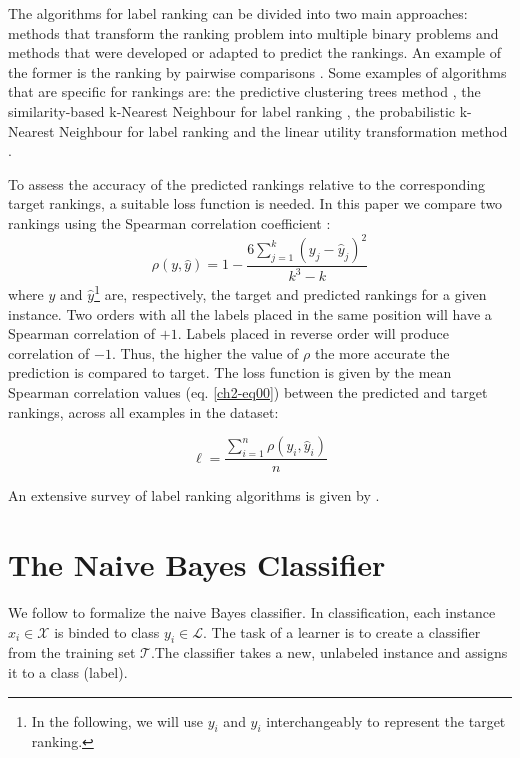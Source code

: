 The algorithms for label ranking can be divided into two main approaches:
methods that transform the ranking problem into multiple binary problems and methods that were developed or adapted to predict the rankings. An example of the former is the ranking by pairwise comparisons \citep{hullermeier}. Some examples of algorithms that are specific for rankings are: the predictive clustering trees method \citep{todorovski2002}, the similarity-based k-Nearest Neighbour for label ranking \citep{brazdil2003}, the probabilistic k-Nearest Neighbour for label ranking \citep{cheng2009} and the linear utility transformation method \citep{har2002,dekel2003}.

To assess the accuracy of the predicted rankings relative to the corresponding target rankings, a suitable loss function is needed. In this paper we compare two rankings using the Spearman correlation coefficient \citep{brazdil2003,vembu2009}:
\begin{equation}
\label{ch2-eq00}
 \rho(y,\hat{y})=1-\frac{6\sum_{j=1}^k(y_j-\hat{y}_j)^2}{k^3-k}
\end{equation}
where $y$ and $\hat{y}$\footnote[3]{ In the following, we will use $y_i$ and $y_i$ interchangeably to represent the target ranking.} are, respectively, the target and predicted rankings for a given instance. Two orders with all the labels placed in the same position will have a Spearman correlation of $+1$. Labels placed in reverse order will produce  correlation of $-1$. Thus, the higher the value of $\rho$ the more accurate the prediction is compared to target. The loss function is given by the mean Spearman correlation values (eq. \ref{ch2-eq00}) between the predicted and target rankings, across all examples in the dataset:

\begin{equation}
\label{ch2-loss}
 \ell=\frac{\sum_{i=1}^n \rho(y_i,\hat{y}_i)}{n}
\end{equation}

An extensive survey of label ranking algorithms is given by \cite{vembu2009}.

\section{The Naive Bayes Classifier}
\label{ch2-sec:naivebayes}

We follow \cite{mitchell1997} to formalize the naive Bayes classifier. In classification, each instance $x_i\in\mathcal{X}$ is binded to class $y_i\in\mathcal{L}$. The task of a learner is to create a classifier from the training set $\mathcal{T}$.The classifier takes a new, unlabeled instance and assigns it to a class (label).

